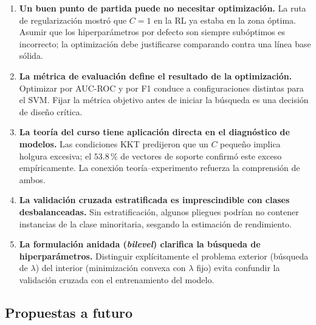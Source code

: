 \documentclass[spanish]{article}
\begin{document}
\begin{enumerate}
    \item \textbf{Un buen punto de partida puede no necesitar optimización.} La ruta de regularización mostró que $C=1$ en la RL ya estaba en la zona óptima. Asumir que los hiperparámetros por defecto son siempre subóptimos es incorrecto; la optimización debe justificarse comparando contra una línea base sólida.

    \item \textbf{La métrica de evaluación define el resultado de la optimización.} Optimizar por AUC-ROC y por F1 conduce a configuraciones distintas para el SVM. Fijar la métrica objetivo antes de iniciar la búsqueda es una decisión de diseño crítica.

    \item \textbf{La teoría del curso tiene aplicación directa en el diagnóstico de modelos.} Las condiciones KKT predijeron que un $C$ pequeño implica holgura excesiva; el $53.8\,\%$ de vectores de soporte confirmó este exceso empíricamente. La conexión teoría–experimento refuerza la comprensión de ambos.

    \item \textbf{La validación cruzada estratificada es imprescindible con clases desbalanceadas.} Sin estratificación, algunos pliegues podrían no contener instancias de la clase minoritaria, sesgando la estimación de rendimiento.

    \item \textbf{La formulación anidada (\textit{bilevel}) clarifica la búsqueda de hiperparámetros.} Distinguir explícitamente el problema exterior (búsqueda de $\lambda$) del interior (minimización convexa con $\lambda$ fijo) evita confundir la validación cruzada con el entrenamiento del modelo.
\end{enumerate}

\subsection{Propuestas a futuro}
\end{document}
